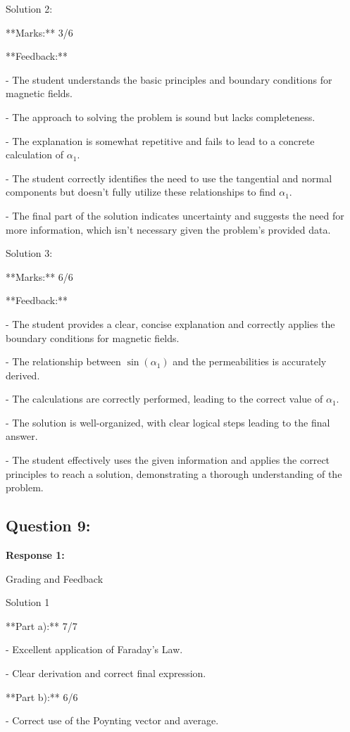 \documentclass[a4paper,11pt]{article}
\begin{document}
Solution 2:

**Marks:** 3/6

**Feedback:**

- The student understands the basic principles and boundary conditions for magnetic fields.

- The approach to solving the problem is sound but lacks completeness.

- The explanation is somewhat repetitive and fails to lead to a concrete calculation of \(\alpha_{1}\).

- The student correctly identifies the need to use the tangential and normal components but doesn't fully utilize these relationships to find \(\alpha_{1}\).

- The final part of the solution indicates uncertainty and suggests the need for more information, which isn't necessary given the problem's provided data.

Solution 3:

**Marks:** 6/6

**Feedback:**

- The student provides a clear, concise explanation and correctly applies the boundary conditions for magnetic fields.

- The relationship between \( \sin(\alpha_{1}) \) and the permeabilities is accurately derived.

- The calculations are correctly performed, leading to the correct value of \(\alpha_{1}\).

- The solution is well-organized, with clear logical steps leading to the final answer.

- The student effectively uses the given information and applies the correct principles to reach a solution, demonstrating a thorough understanding of the problem.

\subsection*{Question 9:}

\textbf{Response 1:}

Grading and Feedback

Solution 1

**Part a):** 7/7

- Excellent application of Faraday's Law.

- Clear derivation and correct final expression.

**Part b):** 6/6

- Correct use of the Poynting vector and average.
\end{document}
